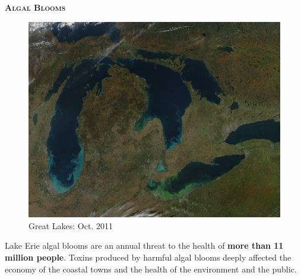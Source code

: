 \documentclass[final,t]{beamer}
\begin{document}
\begin{frame}{}
		\begin{columns}
            \begin{column}{.33\linewidth}
                \begin{block}{\textsc{\textbf{Algal Blooms}}}
                  \vspace*{2mm}
                       
                  \begin{figure}
                    \centering
                        \includegraphics[scale = 0.11]{assets/algalbloom.jpg}
                        \caption{Great Lakes: Oct. 2011}
                  \end{figure}
 Lake Erie algal blooms are an annual threat to the health
                       of \textbf{more than 11 million people}. Toxins produced
                       by harmful algal blooms  deeply affected the economy of the coastal towns
                       and the health of the environment and the public.
                       

\end{block}
\end{column}
\end{columns}
\end{frame}
\end{document}
